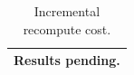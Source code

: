 \begin{table}[t]
\centering\small
\begin{tabular}{l}
\toprule
Results pending. \\
\bottomrule
\end{tabular}
\caption{Incremental recompute cost.}
\label{tab:recompute}
\end{table}
